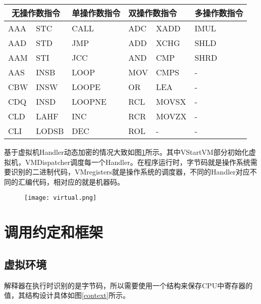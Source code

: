 \begin{table}[htbp]
	\label{registers}
	\begin{tabular}{l|l|l|l|l|l}
		\hline
		\multicolumn{2}{c|}{无操作数指令} & 单操作数指令 & \multicolumn{2}{l|}{双操作数指令} & 多操作数指令 \\ \hline
		AAA          & STC           & CALL   & ADC         & XADD          & IMUL   \\ \hline
		AAD          & STD           & JMP    & ADD         & XCHG          & SHLD   \\ \hline
		AAM          & STI           & JCC    & AND         & CMP           & SHRD   \\ \hline
		AAS          & INSB          & LOOP   & MOV         & CMPS          & -      \\ \hline
		CBW          & INSW          & LOOPE  & OR          & LEA           & -      \\ \hline
		CDQ          & INSD          & LOOPNE & RCL         & MOVSX         & -      \\ \hline
		CLD          & LAHF          & INC    & RCR         & MOVZX         & -      \\ \hline
		CLI          & LODSB         & DEC    & ROL         & -             & -      \\ \hline
	\end{tabular}
	\centering

\end{table}

基于虚拟机Handler动态加密的情况大致如图\ref{virtual}所示。其中VStartVM部分初始化虚拟机，VMDispatcher调度每一个Handler。在程序运行时，字节码就是操作系统需要识别的二进制代码，VMregisters就是操作系统的调度器，不同的Handler对应不同的汇编代码，相对应的就是机器码。

\begin{figure}[htbp]
	 
	\centering
	\texttt{[image: virtual.png]}
	\label{virtual}
\end{figure}



\section{调用约定和框架}

\subsection{虚拟环境}
\label{cha3:sec:virtualcontext}
解释器在执行时识别的是字节码，所以需要使用一个结构来保存CPU中寄存器的值，其结构设计具体如图\ref{context}所示\cite{胡浔惠2019一种应用随机森林的代码混淆路径分支技术}。

